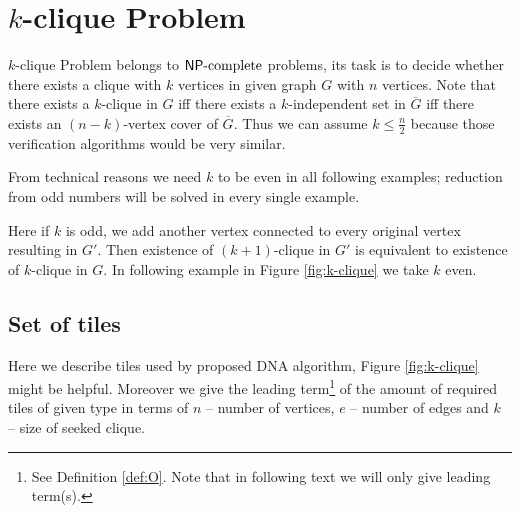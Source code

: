 \section{$k$-clique Problem}

$k$-clique Problem belongs to $\mathsf{NP}\textnormal{-complete}$ problems, its task is to decide whether there exists a clique with $k$ vertices in given graph $G$ with $n$ vertices. Note that there exists a $k$-clique in $G$ iff there exists a $k$-independent set in $\overline{G}$ iff there exists an $(n-k)$-vertex cover of $\overline{G}$. Thus we can assume $k \leq \frac{n}{2}$ because those verification algorithms would be very similar.

From technical reasons we need $k$ to be even in all following examples; reduction from odd numbers will be solved in every single example.

Here if $k$ is odd, we add another vertex connected to every original vertex resulting in $G'$. Then existence of $(k+1)$-clique in $G'$ is equivalent to existence of $k$-clique in $G$. In following example in Figure \ref{fig:k-clique} we take $k$ even.


\subsection*{Set of tiles}

Here we describe tiles used by proposed DNA algorithm, Figure \ref{fig:k-clique} might be helpful. Moreover we give the leading term\footnote{See Definition \ref{def:O}. Note that in following text we will only give leading term(s).} of the amount of required tiles of given type in terms of $n$ -- number of vertices, $e$ -- number of edges and $k$ -- size of seeked clique.

